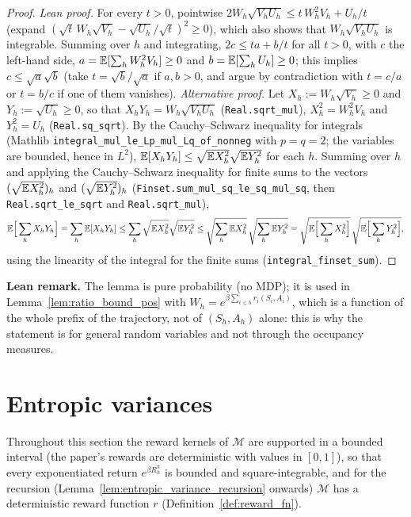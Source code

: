 \begin{proof}
\leanok
\emph{Lean proof.} For every $t > 0$, pointwise
$2W_h\sqrt{V_h U_h} \le t\,W_h^2V_h + U_h/t$ (expand $(\sqrt t\,W_h\sqrt{V_h} - \sqrt{U_h}/\sqrt t)^2 \ge 0$),
which also shows that $W_h\sqrt{V_h U_h}$ is integrable. Summing over $h$ and integrating,
$2c \le t a + b/t$ for all $t > 0$, with $c$ the left-hand side,
$a = \mathbb{E}[\sum_h W_h^2V_h] \ge 0$ and $b = \mathbb{E}[\sum_h U_h] \ge 0$; this implies $c \le \sqrt a\sqrt b$
(take $t = \sqrt b/\sqrt a$ if $a, b > 0$, and argue by contradiction with $t = c/a$ or $t = b/c$ if
one of them vanishes). \emph{Alternative proof.}
Let $X_h := W_h\sqrt{V_h} \ge 0$ and $Y_h := \sqrt{U_h} \ge 0$, so that
$X_h Y_h = W_h\sqrt{V_h U_h}$ (\texttt{Real.sqrt\_mul}), $X_h^2 = W_h^2 V_h$ and $Y_h^2 = U_h$
(\texttt{Real.sq\_sqrt}). By the Cauchy--Schwarz inequality for integrals (Mathlib
\texttt{integral\_mul\_le\_Lp\_mul\_Lq\_of\_nonneg} with $p = q = 2$; the variables are bounded,
hence in $L^2$), $\mathbb{E}[X_h Y_h] \le \sqrt{\mathbb{E} X_h^2}\sqrt{\mathbb{E} Y_h^2}$ for each $h$. Summing over
$h$ and applying the Cauchy--Schwarz inequality for finite sums to the vectors
$(\sqrt{\mathbb{E} X_h^2})_h$ and $(\sqrt{\mathbb{E} Y_h^2})_h$ (\texttt{Finset.sum\_mul\_sq\_le\_sq\_mul\_sq},
then \texttt{Real.sqrt\_le\_sqrt} and \texttt{Real.sqrt\_mul}),
\[
  \mathbb{E}\Big[\sum_h X_h Y_h\Big] = \sum_h\mathbb{E}[X_h Y_h] \le \sum_h\sqrt{\mathbb{E} X_h^2}\sqrt{\mathbb{E} Y_h^2}
  \le \sqrt{\sum_h\mathbb{E} X_h^2}\,\sqrt{\sum_h\mathbb{E} Y_h^2}
  = \sqrt{\mathbb{E}\Big[\sum_h X_h^2\Big]}\,\sqrt{\mathbb{E}\Big[\sum_h Y_h^2\Big]} ,
\]
using the linearity of the integral for the finite sums (\texttt{integral\_finset\_sum}).
\end{proof}

\textbf{Lean remark.} The lemma is pure probability (no MDP); it is used in
Lemma~\ref{lem:ratio_bound_pos} with $W_h = e^{\beta\sum_{i \le h} r_i(S_i,A_i)}$, which is
a function of the whole prefix of the trajectory, not of $(S_h, A_h)$ alone: this is why the
statement is for general random variables and not through the occupancy measures.

\section{Entropic variances}
\label{sec:pre_mdp_entropic_variance}

Throughout this section the reward kernels of $\mathcal M$ are supported in a bounded
interval (the paper's rewards are deterministic with values in $[0, 1]$), so that every
exponentiated return $e^{\beta R^\pi_h}$ is bounded and square-integrable, and for the
recursion (Lemma~\ref{lem:entropic_variance_recursion} onwards) $\mathcal M$ has a
deterministic reward function $r$ (Definition~\ref{def:reward_fn}).

